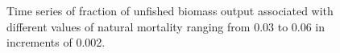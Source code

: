 \documentclass[
]{scrartcl}
\begin{document}
\begin{figure}


\caption{\label{fig-natm-bratio}Time series of fraction of unfished
biomass output associated with different values of natural mortality
ranging from 0.03 to 0.06 in increments of 0.002.}

\end{figure}%
\end{document}
